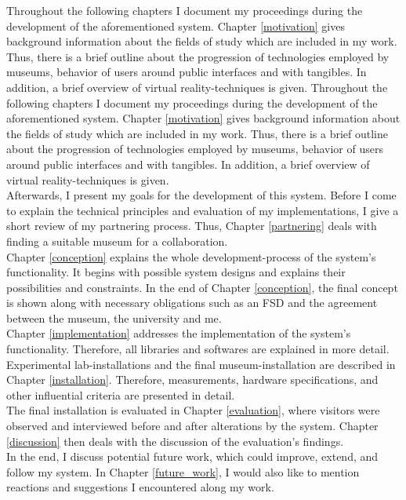 
Throughout the following chapters I document my proceedings during the development of the aforementioned system. Chapter \ref{motivation} gives background information about the fields of study which are included in my work. Thus, there is a brief outline about the progression of technologies employed by museums, behavior of users around public interfaces and with tangibles. In addition, a brief overview of virtual reality-techniques is given.
Throughout the following chapters I document my proceedings during the development of the aforementioned system. Chapter \ref{motivation} gives background information about the fields of study which are included in my work. Thus, there is a brief outline about the progression of technologies employed by museums, behavior of users around public interfaces and with tangibles. In addition, a brief overview of virtual reality-techniques is given.
\\
Afterwards, I present my goals for the development of this system. Before I come to explain the technical principles and evaluation of my implementations, I give a short review of my partnering process. Thus, Chapter \ref{partnering} deals with finding a suitable museum for a collaboration. 
\\
Chapter \ref{conception} explains the whole development-process of the system's functionality. It begins with possible system designs and explains their possibilities and constraints. In the end of Chapter \ref{conception}, the final concept is shown along with necessary obligations such as an \ac{FSD} and the agreement between the museum, the university and me.
\\
Chapter \ref{implementation} addresses the implementation of the system's functionality. Therefore, all libraries and softwares are explained in more detail.
\\
Experimental lab-installations and the final museum-installation are described in Chapter \ref{installation}. Therefore, measurements, hardware specifications, and other influential criteria are presented in detail.
\\
The final installation is evaluated in Chapter \ref{evaluation}, where visitors were observed and interviewed before and after alterations by the system. Chapter \ref{discussion} then deals with the discussion of the evaluation's findings.
\\
In the end, I discuss potential future work, which could improve, extend, and follow my system. In Chapter \ref{future_work}, I would also like to mention reactions and suggestions I encountered along my work.

